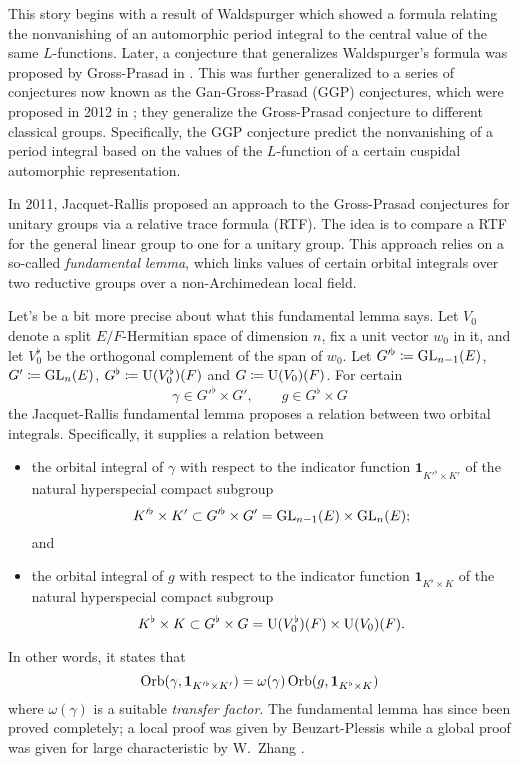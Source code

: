 This story begins with a result of
Waldspurger \cite{ref:waldspurger} which showed a formula
relating the nonvanishing of an automorphic period integral
to the central value of the same $L$-functions.
Later, a conjecture that generalizes Waldspurger's formula
was proposed by Gross-Prasad in \cite{ref:GP1,ref:GP2}.
This was further generalized to a series of conjectures
now known as the Gan-Gross-Prasad (GGP) conjectures,
which were proposed in 2012 in \cite{ref:GGP};
they generalize the Gross-Prasad conjecture to different classical groups.
Specifically, the GGP conjecture predict the nonvanishing of a period integral
based on the values of the $L$-function of a certain cuspidal automorphic representation.

In 2011, Jacquet-Rallis \cite{ref:JR} proposed an approach to the Gross-Prasad conjectures
for unitary groups via a relative trace formula (RTF).
The idea is to compare a RTF for the general linear group to one for a unitary group.
This approach relies on a so-called \emph{fundamental lemma},
which links values of certain orbital integrals
over two reductive groups over a non-Archimedean local field.

Let's be a bit more precise about what this fundamental lemma says.
Let $V_0$ denote a split $E/F$-Hermitian space of dimension $n$,
fix a unit vector $w_0$ in it,
and let $V_0^\flat$ be the orthogonal complement of the span of $w_0$.
Let $G'^\flat \coloneqq \operatorname{GL}_{n-1}(E)$, $G' \coloneqq \operatorname{GL}_n(E)$,
$G^\flat \coloneqq \operatorname{U}(V_0^\flat)(F)$ and $G \coloneqq \operatorname{U}(V_0)(F)$.
For certain
\[ \gamma \in G'^\flat \times G', \qquad g \in G^\flat \times G \]
the Jacquet-Rallis fundamental lemma proposes a relation between two orbital integrals.
Specifically, it supplies a relation between
\begin{itemize}
\item the orbital integral of $\gamma$ with respect to
  the indicator function $\mathbf{1}_{K'^\flat \times K'}$
  of the natural hyperspecial compact subgroup
  \[ K'^\flat \times K' \subset G'^\flat \times G' = \operatorname{GL}_{n-1}(E) \times \operatorname{GL}_n(E); \]
  and
\item the orbital integral of $g$ with respect to
  the indicator function $\mathbf{1}_{K^\flat \times K}$
  of the natural hyperspecial compact subgroup
  \[ K^\flat \times K \subset G^\flat \times G = \operatorname{U}(V_0^\flat)(F) \times \operatorname{U}(V_0)(F). \]
\end{itemize}
In other words, it states that
\begin{equation}
  \operatorname{Orb}(\gamma, \mathbf{1}_{K'^\flat \times K'}) = \omega(\gamma) \operatorname{Orb}(g, \mathbf{1}_{K^\flat \times K})
  \label{eq:old_FL}
\end{equation}
where $\omega(\gamma)$ is a suitable \emph{transfer factor}.
The fundamental lemma has since been proved completely;
a local proof was given by Beuzart-Plessis \cite{ref:BeuzartPlessis}
while a global proof was given for large characteristic by W.\ Zhang \cite{ref:Wei2021}.

